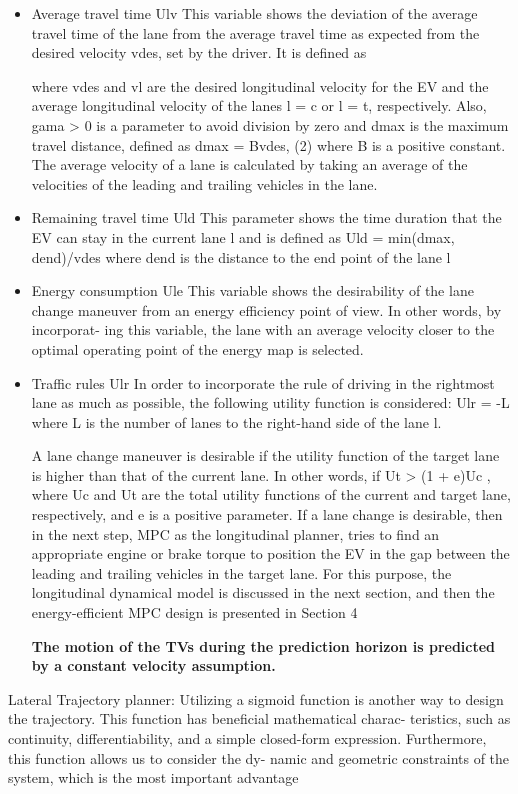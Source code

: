 \documentclass{article}
\begin{document}
\begin{itemize}
\item Average travel time Ulv
This variable shows the deviation of the average travel time of the
lane from the average travel time as expected from the desired velocity
vdes, set by the driver. It is defined as

where vdes and vl are the desired longitudinal velocity for the EV and
the average longitudinal velocity of the lanes l = c or l = t, respectively.
Also, gama > 0 is a parameter to avoid division by zero and dmax is the
maximum travel distance, defined as
dmax = Bvdes, (2)
where B is a positive constant. 
The average velocity of a lane is
calculated by taking an average of the velocities of the leading and
trailing vehicles in the lane.

\item 
Remaining travel time Uld
This parameter shows the time duration that the EV can stay in the
current lane l and is defined as
Uld = min(dmax, dend)/vdes 
where dend is the distance to the end point of the lane l
\item Energy consumption Ule
This variable shows the desirability of the lane change maneuver
from an energy efficiency point of view. In other words, by incorporat-
ing this variable, the lane with an average velocity closer to the optimal
operating point of the energy map is selected.
\item Traffic rules Ulr
In order to incorporate the rule of driving in the rightmost lane as
much as possible, the following utility function is considered: Ulr = -L
where L is the number of lanes to the right-hand side of the lane l.

A lane change maneuver is desirable if the utility function of the
target lane is higher than that of the current lane. In other words, if
Ut > (1 + e)Uc , where Uc and Ut are the total utility functions of the
current and target lane, respectively, and e is a positive parameter.
If a lane change is desirable, then in the next step, MPC as the
longitudinal planner, tries to find an appropriate engine or brake torque
to position the EV in the gap between the leading and trailing vehicles
in the target lane. For this purpose, the longitudinal dynamical model is
discussed in the next section, and then the energy-efficient MPC design
is presented in Section 4

\textbf{The motion of the TVs during the prediction horizon is predicted
by a constant velocity assumption.}

\end{itemize}
Lateral Trajectory planner: Utilizing a sigmoid function is another way to
design the trajectory. This function has beneficial mathematical charac-
teristics, such as continuity, differentiability, and a simple closed-form
expression. Furthermore, this function allows us to consider the dy-
namic and geometric constraints of the system, which is the most
important advantage
\end{document}
